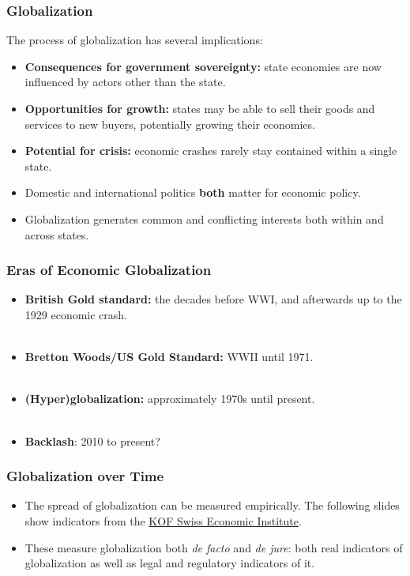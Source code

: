 \documentclass{beamer}
\begin{document}
\begin{frame} 
	\frametitle{\LARGE{Globalization}}
The process of globalization has several implications:
	\begin{itemize}
		\item \textbf{Consequences for government sovereignty:} state economies are now influenced by actors other than the state. \pause 
		\item \textbf{Opportunities for growth:} states may be able to sell their goods and services to new buyers, potentially growing their economies. \pause
		 \item \textbf{Potential for crisis:} economic crashes rarely stay contained within a single state. \pause 
		\item Domestic and international politics \textbf{both} matter for economic policy. \pause 
		\item Globalization generates common and conflicting interests both within and across states.	
	\end{itemize}
\end{frame}

\begin{frame} 
	\frametitle{\LARGE{Eras of Economic Globalization}}
	\begin{itemize}
			\item \textbf{British Gold standard:} the decades before WWI, and afterwards up to the 1929 economic crash. \pause 
			\\~\\ 
			\item \textbf{Bretton Woods/US Gold Standard:} WWII until 1971. \pause 
			\\~\\
			\item \textbf{(Hyper)globalization:} approximately 1970s until present. \pause
			\\~\\
			\item \textbf{Backlash}: 2010 to present?
		\end{itemize}
\end{frame}

\begin{frame} 
	\frametitle{\LARGE{Globalization over Time}}
	\begin{itemize}
	\item The spread of globalization can be measured empirically. The following slides show indicators from the \href{https://kof.ethz.ch/en/forecasts-and-indicators/indicators/kof-globalisation-index.html}{KOF Swiss Economic Institute}. \pause
	\item These measure globalization both \textit{de facto} and \textit{de jure}: both real indicators of globalization as well as legal and regulatory indicators of it.
	\end{itemize}
\end{frame}
\end{document}
